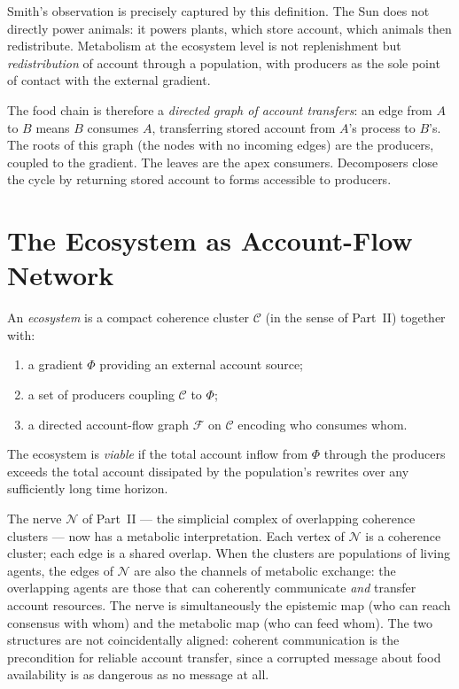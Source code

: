 \begin{remark}
Smith's observation is precisely captured by this definition.
The Sun does not directly power animals: it powers plants, which
store account, which animals then redistribute.
Metabolism at the ecosystem level is not replenishment but
\emph{redistribution} of account through a population, with
producers as the sole point of contact with the external gradient.

The food chain is therefore a \emph{directed graph of account
transfers}: an edge from $A$ to $B$ means $B$ consumes $A$,
transferring stored account from $A$'s process to $B$'s.
The roots of this graph (the nodes with no incoming edges) are
the producers, coupled to the gradient.
The leaves are the apex consumers.
Decomposers close the cycle by returning stored account to
forms accessible to producers.
\end{remark}

\section{The Ecosystem as Account-Flow Network}

\begin{definition}[Ecosystem]
An \emph{ecosystem} is a compact coherence cluster
$\mathcal{C}$ (in the sense of Part~II) together with:
\begin{enumerate}[label=(\roman*)]
  \item a gradient $\Phi$ providing an external account source;
  \item a set of producers coupling $\mathcal{C}$ to $\Phi$;
  \item a directed account-flow graph $\mathcal{F}$ on
        $\mathcal{C}$ encoding who consumes whom.
\end{enumerate}
The ecosystem is \emph{viable} if the total account inflow from
$\Phi$ through the producers exceeds the total account dissipated
by the population's rewrites over any sufficiently long time
horizon.
\end{definition}

\begin{remark}
The nerve $\mathcal{N}$ of Part~II --- the simplicial complex of
overlapping coherence clusters --- now has a metabolic
interpretation.
Each vertex of $\mathcal{N}$ is a coherence cluster; each edge
is a shared overlap.
When the clusters are populations of living agents, the edges of
$\mathcal{N}$ are also the channels of metabolic exchange: the
overlapping agents are those that can coherently communicate
\emph{and} transfer account resources.
The nerve is simultaneously the epistemic map (who can reach
consensus with whom) and the metabolic map (who can feed whom).
The two structures are not coincidentally aligned: coherent
communication is the precondition for reliable account transfer,
since a corrupted message about food availability is as
dangerous as no message at all.
\end{remark}

